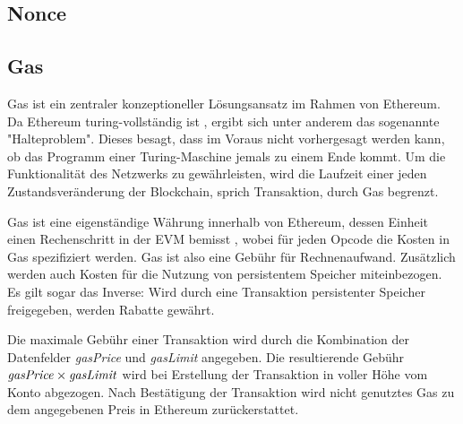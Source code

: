 \documentclass[runningheads]{llncs}
\begin{document}
\subsection{Nonce}
\label{nonce}
\subsection{Gas}
\label{gas}
Gas ist ein zentraler konzeptioneller Lösungsansatz im Rahmen von Ethereum. Da Ethereum turing-vollständig ist \cite[S. 1]{wood_ethereum/yellowpaper_2019}, ergibt sich unter anderem das sogenannte "Halteproblem". Dieses besagt, dass im Voraus nicht vorhergesagt werden kann, ob das Programm einer Turing-Maschine jemals zu einem Ende kommt. \cite[S.70]{davis_computability_2013} Um die Funktionalität des Netzwerks zu gewährleisten, wird die Laufzeit einer jeden Zustandsveränderung der Blockchain, sprich Transaktion, durch Gas begrenzt.

Gas ist eine eigenständige Währung innerhalb von Ethereum, dessen Einheit einen Rechenschritt in der EVM bemisst \cite[S. 9:3]{m.spain_oasics-tokeneconomics_2019}, wobei für jeden Opcode die Kosten in Gas spezifiziert werden. \cite[S. 25 ff.]{wood_ethereum/yellowpaper_2019} Gas ist also eine Gebühr für Rechnenaufwand. Zusätzlich werden auch Kosten für die Nutzung von persistentem Speicher miteinbezogen. Es gilt sogar das Inverse: Wird durch eine Transaktion persistenter Speicher freigegeben, werden Rabatte gewährt.

Die maximale Gebühr einer Transaktion wird durch die Kombination der Datenfelder \textit{gasPrice} und \textit{gasLimit} angegeben. Die resultierende Gebühr $ \text{\textit{gasPrice}} \times \text{\textit{gasLimit}} $ wird bei Erstellung der Transaktion in voller Höhe vom Konto abgezogen. Nach Bestätigung der Transaktion wird nicht genutztes Gas zu dem angegebenen Preis in Ethereum zurückerstattet.
\end{document}
